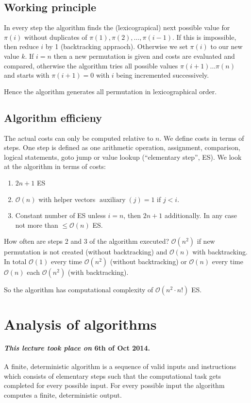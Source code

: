 \documentclass{article}
\newcommand{\dateref}[1]{\paragraph{\textit{This lecture took place on} #1.}}
\begin{document}
\subsection{Working principle}
%
In every step the algorithm finds the (lexicograpical) next possible value for $\pi(i)$ without duplicates of $\pi(1), \pi(2), \ldots, \pi(i-1)$. If this is impossible, then reduce $i$ by 1 (backtracking appraoch). Otherwise we set $\pi(i)$ to our new value $k$. If $i = n$ then a new permutation is given and costs are evaluated and compared, otherwise the algorithm tries all possible values $\pi(i+1)\ldots \pi(n)$ and starts with $\pi(i+1) = 0$ with $i$ being incremented successively.

Hence the algorithm generates all permutation in lexicographical order.

\subsection{Algorithm efficieny}
%
The actual costs can only be computed relative to $n$. We define costs in terms of steps. One step is defined as one arithmetic operation, assignment, comparison, logical statements, goto jump or value lookup (``elementary step'', ES). We look at the algorithm in terms of costs:

\begin{enumerate}
  \item $2n + 1$ ES
  \item $\mathcal{O}(n)$ with helper vectors $\operatorname{auxiliary}(j) = 1$ if $j < i$.
  \item Constant number of ES unless $i=n$, then $2n + 1$ additionally. In any case not more than $\leq \mathcal{O}(n)$ ES.
\end{enumerate}

How often are steps 2 and 3 of the algorithm executed? $\mathcal{O}(n^2)$ if new permutation is not created (without backtracking) and $\mathcal{O}(n)$ with backtracking. In total $\mathcal{O}(1)$ every time $\mathcal{O}(n^2)$ (without backtracking) or $\mathcal{O}(n)$ every time $\mathcal{O}(n)$ each $\mathcal{O}(n^2)$ (with backtracking).

So the algorithm has computational complexity of $\mathcal{O}(n^2 \cdot n!)$ ES.

\section{Analysis of algorithms}
\dateref{6th of Oct 2014}
%
A finite, deterministic algorithm is a sequence of valid inputs and instructions which consists of elementary steps such that the computational task gets completed for every possible input. For every possible input the algorithm computes a finite, deterministic output.
\end{document}
